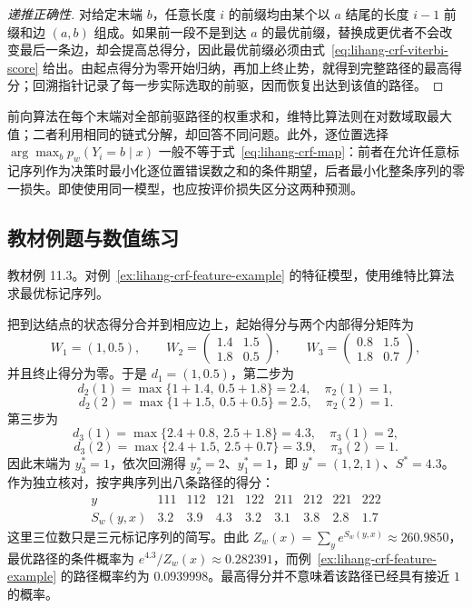 \begin{proof}[递推正确性]
对给定末端 $b$，任意长度 $i$ 的前缀均由某个以 $a$ 结尾的长度 $i-1$ 前缀和边 $(a,b)$ 组成。如果前一段不是到达 $a$ 的最优前缀，替换成更优者不会改变最后一条边，却会提高总得分，因此最优前缀必须由式~\eqref{eq:lihang-crf-viterbi-score} 给出。由起点得分为零开始归纳，再加上终止势，就得到完整路径的最高得分；回溯指针记录了每一步实际选取的前驱，因而恢复出达到该值的路径。
\end{proof}

前向算法在每个末端对全部前驱路径的权重求和，维特比算法则在对数域取最大值；二者利用相同的链式分解，却回答不同问题。此外，逐位置选择 $\arg\max_b p_w(Y_i=b\mid x)$ 一般不等于式~\eqref{eq:lihang-crf-map}：前者在允许任意标记序列作为决策时最小化逐位置错误数之和的条件期望，后者最小化整条序列的零一损失。即使使用同一模型，也应按评价损失区分这两种预测。

\subsection{教材例题与数值练习}
\label{subsec:lihang-crf-decoding-examples}

\begin{example}
\label{ex:lihang-crf-viterbi-example}
教材例 11.3。对例~\ref{ex:lihang-crf-feature-example} 的特征模型，使用维特比算法求最优标记序列。
\end{example}
\begin{solve}
把到达结点的状态得分合并到相应边上，起始得分与两个内部得分矩阵为
\[
  W_1=(1,0.5),\qquad
  W_2=\begin{pmatrix}1.4&1.5\\1.8&0.5\end{pmatrix},\qquad
  W_3=\begin{pmatrix}0.8&1.5\\1.8&0.7\end{pmatrix},
\]
并且终止得分为零。于是 $d_1=(1,0.5)$，第二步为
\[
  d_2(1)=\max\{1+1.4,\ 0.5+1.8\}=2.4,\quad \pi_2(1)=1,
\]
\[
  d_2(2)=\max\{1+1.5,\ 0.5+0.5\}=2.5,\quad \pi_2(2)=1.
\]
第三步为
\[
  d_3(1)=\max\{2.4+0.8,\ 2.5+1.8\}=4.3,\quad \pi_3(1)=2,
\]
\[
  d_3(2)=\max\{2.4+1.5,\ 2.5+0.7\}=3.9,\quad \pi_3(2)=1.
\]
因此末端为 $y_3^*=1$，依次回溯得 $y_2^*=2$、$y_1^*=1$，即 $y^*=(1,2,1)$、$S^*=4.3$。作为独立核对，按字典序列出八条路径的得分：
\[
\begin{array}{c|rrrrrrrr}
 y&111&112&121&122&211&212&221&222\\\hline
 S_w(y,x)&3.2&3.9&4.3&3.2&3.1&3.8&2.8&1.7
\end{array}
\]
这里三位数只是三元标记序列的简写。由此 $Z_w(x)=\sum_y e^{S_w(y,x)}\approx260.9850$，最优路径的条件概率为 $e^{4.3}/Z_w(x)\approx0.282391$，而例~\ref{ex:lihang-crf-feature-example} 的路径概率约为 $0.0939998$。最高得分并不意味着该路径已经具有接近 $1$ 的概率。
\end{solve}

